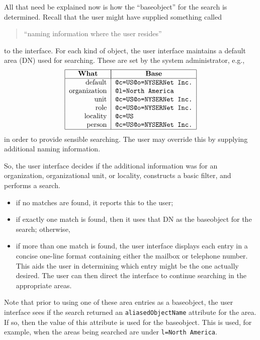 All that need be explained now is how the ``baseobject'' for the search is
determined.
Recall that the user might have supplied something called
\begin{quote}
``naming information where the user resides''
\end{quote}
to the interface.
For each kind of object,
the user interface maintains a default area (DN) used for searching.
These are set by the system administrator,
e.g.,
\[\begin{tabular}{|r|l|}
\hline
\multicolumn{1}{|c|}{\bf What}&
		\multicolumn{1}{|c|}{\bf Base}\\
\hline
default&	\tt @c=US@o=NYSERNet Inc.\\
organization&	\tt @l=North America\\
unit&		\tt @c=US@o=NYSERNet Inc.\\
role&		\tt @c=US@o=NYSERNet Inc.\\
locality&	\tt @c=US\\
person&		\tt @c=US@o=NYSERNet Inc.\\
\hline
\end{tabular}\]
in order to provide sensible searching.
The user may override this by supplying additional naming information.

So,
the user interface decides if the additional information was for an
organization, organizational unit, or locality,
constructs a basic filter, and performs a search.
\begin{itemize}
\item	if no matches are found,
	it reports this to the user;

\item	if exactly one match is found,
	then it uses that DN as the baseobject for the search;
	otherwise,

\item	if more than one match is found,
	the user interface displays each entry in a concise one-line format
	containing either the mailbox or telephone number.
	This aids the user in determining which entry might be the one
	actually desired.
	The user can then direct the interface to continue searching in the
	appropriate areas.
\end{itemize}
Note that prior to using one of these area entries as a baseobject,
the user interface sees if the search returned an \verb"aliasedObjectName"
attribute for the area.
If so,
then the value of this attribute is used for the baseobject.
This is used,
for example,
when the areas being searched are under \verb"l=North America".

